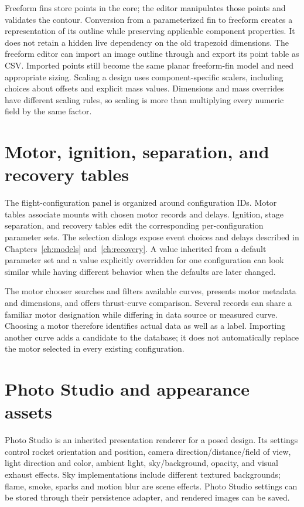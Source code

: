 Freeform fins store points in the core; the editor manipulates those points and validates the contour. Conversion from a parameterized fin to freeform creates a representation of its outline while preserving applicable component properties. It does not retain a hidden live dependency on the old trapezoid dimensions. The freeform editor can import an image outline through  and export its point table as CSV. Imported points still become the same planar freeform-fin model and need appropriate sizing. Scaling a design uses component-specific scalers, including choices about offsets and explicit mass values. Dimensions and mass overrides have different scaling rules, so scaling is more than multiplying every numeric field by the same factor.


\section{Motor, ignition, separation, and recovery tables}
The flight-configuration panel is organized around configuration IDs. Motor tables associate mounts with chosen motor records and delays. Ignition, stage separation, and recovery tables edit the corresponding per-configuration parameter sets. The selection dialogs expose event choices and delays described in Chapters~\ref{ch:models} and~\ref{ch:recovery}. A value inherited from a default parameter set and a value explicitly overridden for one configuration can look similar while having different behavior when the defaults are later changed.

The motor chooser searches and filters available curves, presents motor metadata and dimensions, and offers thrust-curve comparison. Several records can share a familiar motor designation while differing in data source or measured curve. Choosing a motor therefore identifies actual data as well as a label. Importing another curve adds a candidate to the database; it does not automatically replace the motor selected in every existing configuration.

\section{Photo Studio and appearance assets}
Photo Studio is an inherited presentation renderer for a posed design. Its settings control rocket orientation and position, camera direction/distance/field of view, light direction and color, ambient light, sky/background, opacity, and visual exhaust effects. Sky implementations include different textured backgrounds; flame, smoke, sparks and motion blur are scene effects. Photo Studio settings can be stored through their persistence adapter, and rendered images can be saved.

